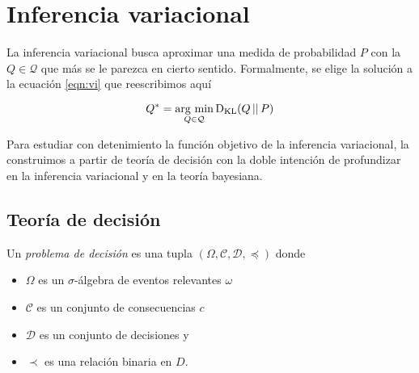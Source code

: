 \documentclass[main.tex]{subfiles}
\begin{document}
\chapter{Inferencia variacional}
La inferencia variacional busca aproximar una medida de probabilidad $P$ con la $Q\in\mathcal{Q}$ que más se le parezca en cierto sentido. Formalmente, se elige la solución a la ecuación \eqref{eqn:vi} que reescribimos aquí

\begin{equation*}
	Q^* = \operatorname*{arg\,\min}_{Q \in \mathcal{Q}} \operatorname*{D_{KL}}(Q\operatorname*{\mid\mid} P)
\end{equation*}

Para estudiar con detenimiento la función objetivo de la inferencia variacional, la construimos a partir de teoría de decisión con la doble intención de profundizar en la inferencia variacional y en la teoría bayesiana. 

\section{Teoría de decisión}
\begin{definition}
	Un \textit{problema de decisión} es una tupla $(\Omega, \mathcal{C}, \mathcal{D}, \preceq)$ donde
	\begin{itemize}
		\item $\Omega$ es un $\sigma$-álgebra de eventos relevantes $\omega$
		\item $\mathcal{C}$ es un conjunto de consecuencias $c$
		\item $\mathcal{D}$ es un conjunto de decisiones y 
		\item $\prec$ es una relación binaria en $D$.
	\end{itemize}
\end{definition}
	
\end{document}
